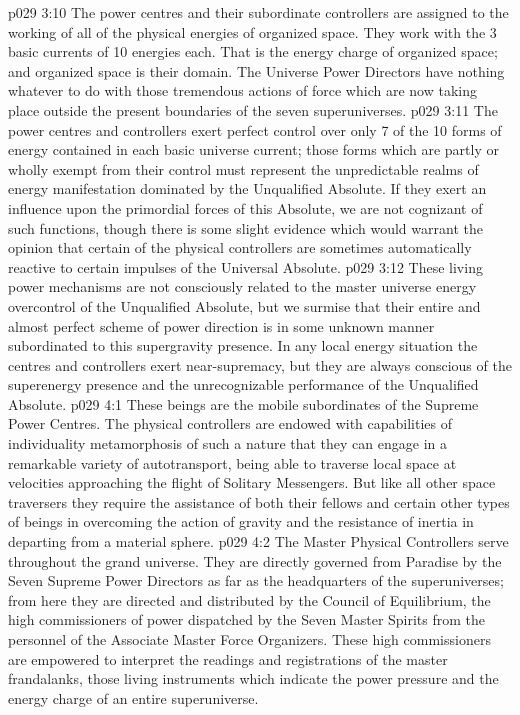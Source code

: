\vs p029 3:10 \pc The power centres and their subordinate controllers are assigned to the working of all of the physical energies of organized space. They work with the 3 basic currents of 10 energies each. That is the energy charge of organized space; and organized space is their domain. The Universe Power Directors have nothing whatever to do with those tremendous actions of force which are now taking place outside the present boundaries of the seven superuniverses.
\vs p029 3:11 The power centres and controllers exert perfect control over only 7 of the 10 forms of energy contained in each basic universe current; those forms which are partly or wholly exempt from their control must represent the unpredictable realms of energy manifestation dominated by the Unqualified Absolute. If they exert an influence upon the primordial forces of this Absolute, we are not cognizant of such functions, though there is some slight evidence which would warrant the opinion that certain of the physical controllers are sometimes automatically reactive to certain impulses of the Universal Absolute.
\vs p029 3:12 These living power mechanisms are not consciously related to the master universe energy overcontrol of the Unqualified Absolute, but we surmise that their entire and almost perfect scheme of power direction is in some unknown manner subordinated to this supergravity presence. In any local energy situation the centres and controllers exert near\hyp{}supremacy, but they are always conscious of the superenergy presence and the unrecognizable performance of the Unqualified Absolute.
\vs p029 4:1 These beings are the mobile subordinates of the Supreme Power Centres. The physical controllers are endowed with capabilities of individuality metamorphosis of such a nature that they can engage in a remarkable variety of autotransport, being able to traverse local space at velocities approaching the flight of Solitary Messengers. But like all other space traversers they require the assistance of both their fellows and certain other types of beings in overcoming the action of gravity and the resistance of inertia in departing from a material sphere.
\vs p029 4:2 The Master Physical Controllers serve throughout the grand universe. They are directly governed from Paradise by the Seven Supreme Power Directors as far as the headquarters of the superuniverses; from here they are directed and distributed by the Council of Equilibrium, the high commissioners of power dispatched by the Seven Master Spirits from the personnel of the Associate Master Force Organizers. These high commissioners are empowered to interpret the readings and registrations of the master frandalanks, those living instruments which indicate the power pressure and the energy charge of an entire superuniverse.
